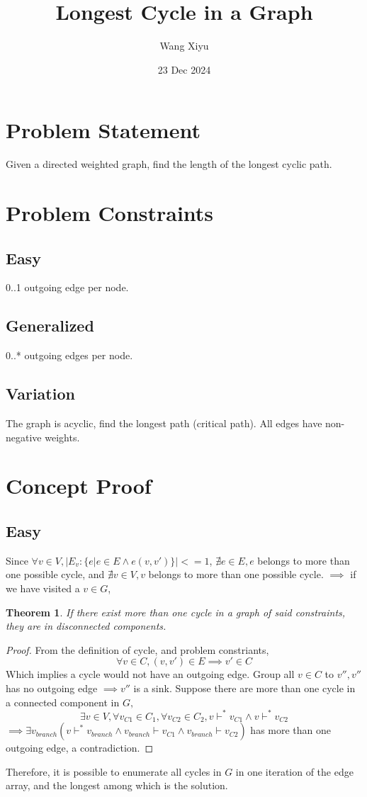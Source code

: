 \documentclass{article}
\newtheorem{theorem}{Theorem}[section]
\begin{document}
\title{Longest Cycle in a Graph}
\author{Wang Xiyu}
\date{23 Dec 2024}
\maketitle

\section*{Problem Statement}
Given a directed weighted graph, find the length of the longest cyclic path. 
\section*{Problem Constraints}
\subsection*{Easy}
0..1 outgoing edge per node.
\subsection*{Generalized}
0..* outgoing edges per node.
\subsection*{Variation}
The graph is acyclic, find the longest path (critical path). All edges have non-negative weights.
\section*{Concept Proof}
\subsection*{Easy}
Since $\forall v \in V, |E_v: \{e | e \in E \land e(v, v')\}| <= 1$, $\nexists e \in E, e$ 
belongs to more than one possible cycle, and $\nexists v \in V, v$ belongs to more than one possible cycle.
$\implies$ if we have visited a $v \in G$, 

\begin{theorem}
    If there exist more than one cycle in a graph of said constraints, they are in disconnected components.
\end{theorem}
\begin{proof}
    \indent From the definition of cycle, and problem constriants,
    \[\forall v \in C, (v, v') \in E \implies v' \in C\]
    Which implies a cycle would not have an outgoing edge. Group all $v \in C$ to $v'', v'' $ has no outgoing edge $\implies v'' $ is a sink.
    Suppose there are more than one cycle in a connected component in 
    $G, $
    \[\exists v\in V, \forall v_{C1} \in C_1, \forall v_{C2} \in C_2, v \vdash^* v_{C1} \land v \vdash^* v_{C2}\]
    $\implies \exists v_{branch}(v \vdash^* v_{branch} \land v_{branch} \vdash v_{C1} \land v_{branch} \vdash v_{C2})$ has more than one outgoing edge, a contradiction.
\end{proof}
\noindent Therefore, it is possible to enumerate all cycles in $G$ in one iteration of the edge array, and the longest among which is the solution.
\end{document}
